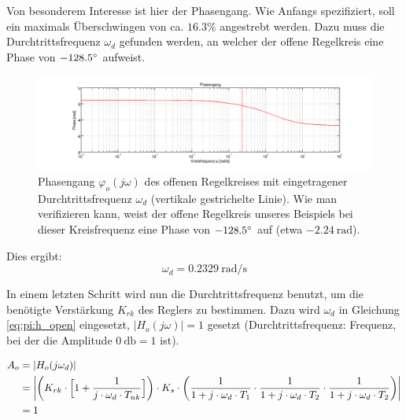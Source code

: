 Von besonderem  Interesse ist  hier der Phasengang. Wie  Anfangs spezifiziert,
soll  ein maximals  \"Uberschwingen von  ca. $16.3\%$ angestrebt  werden. Dazu
muss die Durchtrittsfrequenz $\omega_d$ gefunden werden, an welcher der offene
Regelkreis eine Phase von $-128.5\degree$ aufweist. \footnotemark[2]


\begin{figure}[h! width=\pagewidth]
    \includegraphics[width=.9\textwidth]{images/piOffenerRegelkreisPhasengang.png}
    \caption{%
        Phasengang   $\varphi_o(j\omega)$   des   offenen   Regelkreises   mit
        eingetragener Durchtrittsfrequenz $\omega_{d}$ (vertikale gestrichelte
        Linie). Wie man verifizieren kann, weist der offene Regelkreis unseres
        Beispiels bei dieser Kreisfrequenz  eine Phase von $-128.5\degree$ auf
        (etwa $\SI{-2.24}{\radian}$).
    }
    \label{fig:pi:omega_d}
\end{figure}

Dies ergibt:
\begin{equation} \label{eq:pi:omega_d}
    \omega_d = \SI{0.2329}{\radian\per\second}
\end{equation}

In  einem  letzten  Schritt  wird  nun  die  Durchtrittsfrequenz  benutzt,  um
die  ben\"otigte Verst\"arkung  $K_{rk}$ des  Reglers zu  bestimmen. Dazu wird
$\omega_d$ in  Gleichung \ref{eq:pi:h_open}  eingesetzt, $|H_o(j\omega)|  = 1$
gesetzt    (Durchtrittsfrequenz: Frequenz,     bei    der     die    Amplitude
$\SI{0}{\decibel} = 1$ ist).

\begin{gather} \label{eq:pi:A_o_set_to_one}
    \begin{split}
        A_o & = | H_o (j\omega_d) | \\
            & = \abs*{
                    \bigg(
                        K_{rk} \cdot \Big[ 1 + \frac{1}{j \cdot \omega_d \cdot T_{nk}} \Big]
                    \bigg)
                    \cdot
                    K_s
                    \cdot
                    \bigg(
                            \frac{1}{1 + j \cdot \omega_d \cdot T_1}
                      \cdot \frac{1}{1 + j \cdot \omega_d \cdot T_2}
                      \cdot \frac{1}{1 + j \cdot \omega_d \cdot T_2}
                      \bigg)} \\
              & = 1
    \end{split}
\end{gather}

